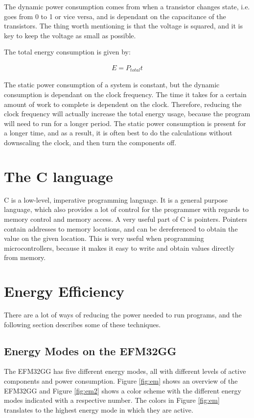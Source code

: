 The dynamic power consumption comes from when a transistor changes state, i.e. goes from 0 to 1 or vice versa, and is dependant on the capacitance of the transistors. The thing worth mentioning is that the voltage is squared, and it is key to keep the voltage as small as possible.

The total energy consumption is given by:

\begin{gather}
\label{cycle-formula}
E = P_{total} t
\end{gather}

The static power consumption of a system is constant, but the dynamic consumption is dependant on the clock frequency. The time it takes for a certain amount of work to complete is dependent on the clock. Therefore, reducing the clock frequency will actually increase the total energy usage, because the program will need to run for a longer period. The static power consumption is present for a longer time, and as a result, it is often best to do the calculations without downscaling the clock, and then turn the components off.

\section{The C language}
C is a low-level, imperative programming language. It is a general purpose language, which also provides a lot of control for the programmer with regards to memory control and memory access. A very useful part of C is pointers. Pointers contain addresses to memory locations, and can be dereferenced to obtain the value on the given location. This is very useful when programming microcontrollers, because it makes it easy to write and obtain values directly from memory.

\section{Energy Efficiency}

There are a lot of ways of reducing the power needed to run programs, and the following section describes some of these techniques.

\subsection{Energy Modes on the EFM32GG}
The EFM32GG has five different energy modes, all with different levels of active components and power consumption. Figure \ref{fig:em} shows an overview of the EFM32GG and Figure \ref{fig:em2} shows a color scheme with the different energy modes indicated with a respective number. The colors in Figure \ref{fig:em} translates to the highest energy mode in which they are active.

